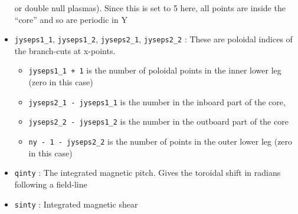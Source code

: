 \documentclass[12pt]{article}
\newcommand{\code}[1]{\texttt{#1}}
\begin{document}
\begin{itemize}
or double null plasmas). Since this is set to 5 here, all points are inside the ``core'' and so are periodic in Y
\item \code{jyseps1\_1}, \code{jyseps1\_2}, \code{jyseps2\_1}, \code{jyseps2\_2} : These are poloidal indices
  of the branch-cuts at x-points. 
  \begin{itemize}
  \item \code{jyseps1\_1 + 1} is the number of poloidal points in the inner lower leg (zero in this case)
  \item \code{jyseps2\_1 - jyseps1\_1} is the number in the inboard part of the core, 
  \item \code{jyseps2\_2 - jyseps1\_2} is the number in the outboard part of the core
  \item \code{ny - 1 - jyseps2\_2} is the number of points in the outer lower leg (zero in this case)
  \end{itemize}
\item \code{qinty} : The integrated magnetic pitch. Gives the toroidal shift in radians following a field-line
\item \code{sinty} : Integrated magnetic shear
\end{itemize}
\end{document}
